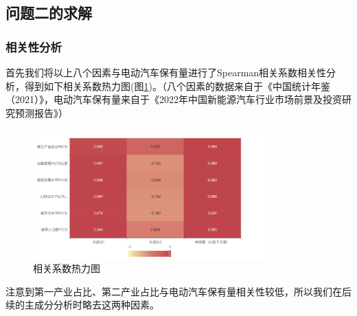 \documentclass[12pt, a4paper, oneside]{ctexart}
\begin{document}
    \subsection{问题二的求解}
    \subsubsection{相关性分析}
    首先我们将以上八个因素与电动汽车保有量进行了Spearman相关系数相关性分析，得到如下相关系数热力图(图\ref{fig:相关系数热力图})。（八个因素的数据来自于《中国统计年鉴（2021）》\cite{cite:统计年鉴}，电动汽车保有量来自于《2022年中国新能源汽车行业市场前景及投资研究预测报告》\cite{cite:预测报告}）
    \begin{figure}[h]
        \centering
        \includegraphics[width=0.8\textwidth]{pic/相关系数热力图.png}
        \caption{相关系数热力图}
        \label{fig:相关系数热力图}
    \end{figure}

    注意到第一产业占比、第二产业占比与电动汽车保有量相关性较低，所以我们在后续的主成分分析时略去这两种因素。
\end{document}
